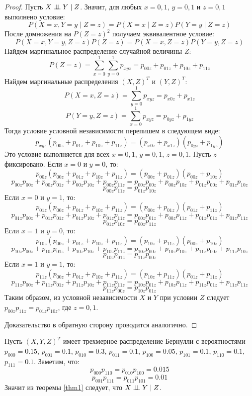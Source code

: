 \begin{proof}
    Пусть $X \perp\!\!\!\perp Y \mid Z$. Значит, для любых $x=0,1$, $y=0,1$ и $z=0,1$ выполнено условие:
    $$
        P(X=x, Y=y \mid Z = z) = P(X=x \mid Z = z) P(Y=y \mid Z = z)
    $$
    После домножения на $P(Z=z)^2$ получаем эквивалентное условие:
    $$
        P(X=x,Y=y,Z=z)P(Z=z)=P(X=x,Z=z)P(Y=y,Z=z)
    $$
    Найдем маргинальное распределение случайной величины $Z$:
    $$
        P(Z=z)=\sum_{x=0}^{1} \sum_{y=0}^{1} p_{xyz} = p_{00z} + p_{01z} + p_{10z} + p_{11z}
    $$
    Найдем маргинальные распределения $(X,Z)^T$ и $(Y,Z)^T$:
    $$
        P(X=x, Z=z) = \sum_{y=0}^{1} p_{xyz} = p_{x0z} + p_{x1z}
    $$
    $$
        P(Y=y, Z=z) = \sum_{x=0}^{1} p_{xyz} = p_{0yz} + p_{1yz}
    $$
    Тогда условие условной независимости перепишем в следующем виде:
    $$
        p_{xyz} (p_{00z} + p_{01z} + p_{10z} + p_{11z}) = (p_{x0z} + p_{x1z}) (p_{0yz} + p_{1yz})
    $$
    Это условие выполняется для всех $x=0,1$, $y=0,1$, $z=0,1$.
    Пусть $z$ фиксировано.
    Если $x=0$ и $y=0$, то:
    $$
        p_{00z} (p_{00z} + p_{01z} + p_{10z} + p_{11z}) = (p_{00z} + p_{01z}) (p_{00z} + p_{10z})
    $$
    $$
        p_{00z} p_{00z} + p_{00z} p_{01z} + p_{00z} p_{10z} + p_{00z} p_{11z} =
        p_{00z} p_{00z} + p_{00z} p_{10z} + p_{01z} p_{00z} + p_{01z} p_{10z}
    $$
    $$
        p_{00z} p_{11z} = p_{01z} p_{10z}
    $$
    Если $x=0$ и $y=1$, то:
    $$
        p_{01z} (p_{00z} + p_{01z} + p_{10z} + p_{11z}) = (p_{00z} + p_{01z}) (p_{01z} + p_{11z})
    $$
    $$
        p_{01z}p_{00z} + p_{01z}p_{01z} + p_{01z}p_{10z} + p_{01z}p_{11z} =
        p_{00z}p_{01z} + p_{00z} p_{11z} + p_{01z} p_{01z} + p_{01z} p_{11z}
    $$
    $$
        p_{01z}p_{10z}=p_{00z} p_{11z}
    $$
    Если $x=1$ и $y=0$, то:
    $$
        p_{10z} (p_{00z} + p_{01z} + p_{10z} + p_{11z}) = (p_{10z} + p_{11z}) (p_{00z} + p_{10z})
    $$
    $$
        p_{10z} p_{00z} + p_{10z} p_{01z} + p_{10z} p_{10z} + p_{10z} p_{11z} = p_{10z}p_{00z} + p_{10z}p_{10z} + p_{11z}p_{00z} + p_{11z}p_{10z}
    $$
    $$
        p_{10z} p_{01z} = p_{11z}p_{00z}
    $$
    Если $x=1$ и $y=1$, то:
    $$
        p_{11z} (p_{00z} + p_{01z} + p_{10z} + p_{11z}) = (p_{10z} + p_{11z}) (p_{01z} + p_{11z})
    $$
    $$
        p_{11z} p_{00z} + p_{11z} p_{01z} + p_{11z} p_{10z} + p_{11z} p_{11z} = p_{10z} p_{01z} + p_{10z}p_{11z} + p_{11z}p_{01z} +
        p_{11z} p_{11z}
    $$
    $$
        p_{11z} p_{00z} = p_{10z} p_{01z}
    $$
    Таким образом, из условной независимости $X$ и $Y$ при условии $Z$ следует
    $p_{00z}p_{11z}=p_{01z}p_{10z}$, где $z=0,1$.

    Доказательство в обратную сторону проводится аналогично.
\end{proof}

\begin{example}
    Пусть $(X,Y,Z)^T$ имеет трехмерное распределение Бернулли с вероятностями
    $p_{000}=0.15$, $p_{001}=0.1$, $p_{010}=0.3$, $p_{011}=0.1$, $p_{100}=0.05$, $p_{101}=0.1$,
    $p_{110}=0.1$, $p_{111}=0.1$.
    Заметим, что:
    $$p_{000}p_{110}=p_{010}p_{100}=0.015$$ $$p_{001}p_{111}=p_{011}p_{101}=0.01$$
    Значит из теоремы \ref{thm1} следует, что $X \perp\!\!\!\perp Y \mid Z$.
\end{example}
